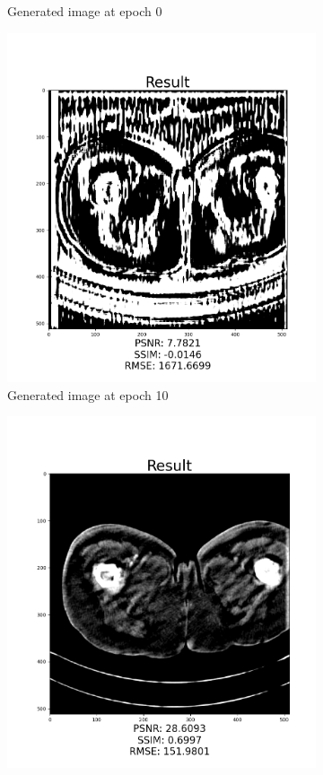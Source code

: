 \documentclass[journal]{IEEEtran}
\begin{document}
\begin{figure}
\begin{subfigure}[t]{0.22\textwidth}
         \caption{Generated image at epoch 0}
         \label{epoch0}
     \end{subfigure}
     \begin{subfigure}[t]{0.22\textwidth}
         \centering
         \includegraphics[width=\textwidth]{epoch10}
         \caption{Generated image at epoch 10}
         \label{epoch10}
     \end{subfigure}
     \begin{subfigure}[t]{0.22\textwidth}
         \centering
         \includegraphics[width=\textwidth]{epoch100}

\end{subfigure}
\end{figure}
\end{document}
